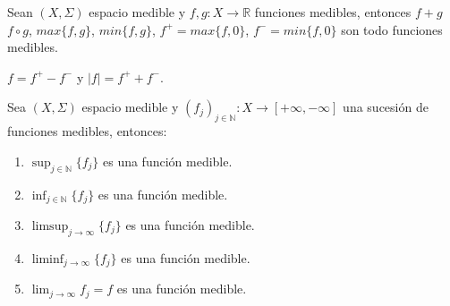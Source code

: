 \begin{corolario}
    Sean $(X, \Sigma)$ espacio medible y $f, g: X \to \mathbb{R}$ funciones medibles, entonces $f + g$ $f \circ g$, $max\{f, g\}$, $min\{f, g\}$, $f^+=max\{f, 0\}$, $f^- = min\{f, 0\}$ son todo funciones medibles.
\end{corolario}
\begin{observación}
$f = f^+ - f^-$ y $|f| = f^+ + f^-.$
\end{observación}
\begin{teorema}
    Sea $(X, \Sigma)$ espacio medible y $(f_j)_{j \in \mathbb{N}}: X \to [+\infty, -\infty]$ una sucesión de funciones medibles, entonces:
    \begin{enumerate}
        \item $\sup_{j \in \mathbb{N}}\{f_j\}$ es una función medible.
        \item $\inf_{j \in \mathbb{N}}\{f_j\}$ es una función medible.
        \item $\limsup_{j \to \infty}\{f_j\}$ es una función medible.
        \item $\liminf_{j \to \infty}\{f_j\}$ es una función medible.
        \item $\lim_{j \to \infty}f_j = f$ es una función medible.
    \end{enumerate}
\end{teorema}
